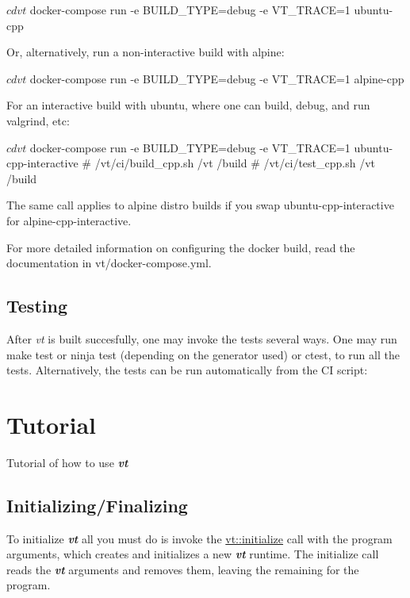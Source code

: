 \begin{DoxyCode}
$ cd vt
$ docker-compose run -e BUILD\_TYPE=debug -e VT\_TRACE=1 ubuntu-cpp
\end{DoxyCode}


Or, alternatively, run a non-\/interactive build with alpine\+:


\begin{DoxyCode}
$ cd vt
$ docker-compose run -e BUILD\_TYPE=debug -e VT\_TRACE=1 alpine-cpp
\end{DoxyCode}


For an interactive build with ubuntu, where one can build, debug, and run {\ttfamily valgrind}, etc\+:


\begin{DoxyCode}
$ cd vt
$ docker-compose run -e BUILD\_TYPE=debug -e VT\_TRACE=1 ubuntu-cpp-interactive
# /vt/ci/build\_cpp.sh /vt /build
# /vt/ci/test\_cpp.sh /vt /build
\end{DoxyCode}


The same call applies to alpine distro builds if you swap {\ttfamily ubuntu-\/cpp-\/interactive} for {\ttfamily alpine-\/cpp-\/interactive}.

For more detailed information on configuring the docker build, read the documentation in {\ttfamily vt/docker-\/compose.\+yml}.\hypertarget{vt-build_test-vt}{}\subsection{Testing}\label{vt-build_test-vt}
After {\itshape vt} is built succesfully, one may invoke the tests several ways. One may run {\ttfamily make test} or {\ttfamily ninja test} (depending on the generator used) or {\ttfamily ctest}, to run all the tests. Alternatively, the tests can be run automatically from the CI script\+:


 \hypertarget{tutorial}{}\section{Tutorial}\label{tutorial}
Tutorial of how to use {\bfseries {\itshape vt}}\hypertarget{tutorial_tutorial-init-finalize-vt}{}\subsection{Initializing/\+Finalizing}\label{tutorial_tutorial-init-finalize-vt}
To initialize {\bfseries {\itshape vt}} all you must do is invoke the {\ttfamily \hyperlink{namespacevt_aaa266774ea8339c58be0202b00fafa62}{vt\+::initialize}} call with the program arguments, which creates and initializes a new {\bfseries {\itshape vt}} runtime. The initialize call reads the {\bfseries {\itshape vt}} arguments and removes them, leaving the remaining for the program.



